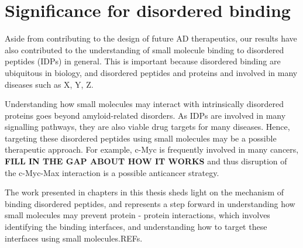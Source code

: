 
\section{Significance for disordered binding}
Aside from contributing to the design of future AD therapeutics, our results have also contributed to the understanding of small molecule binding to disordered peptides (IDPs) in general. This is important because disordered binding are ubiquitous in biology, and disordered peptides and proteins and involved in many diseases such as X, Y, Z.  

Understanding how small molecules may interact with intrinsically disordered proteins goes beyond amyloid-related disorders. As IDPs are involved in many signalling pathways, they are also viable drug targets for many diseases.   Hence, targeting these disordered peptides using small molecules may be a possible therapeutic approach. For example, c-Myc is frequently involved in many cancers, \textbf{FILL IN THE GAP ABOUT HOW IT WORKS} and thus disruption of the c-Myc-Max interaction is a possible anticancer strategy.\cite{Iakoucheva:2002uv,Metallo:2010p6822,Cuchillo:2012bm}

The work presented in chapters in this thesis sheds light on the mechanism of binding disordered peptides, and represents a step forward in understanding how small molecules may prevent protein - protein interactions, which involves identifying the binding interfaces, and understanding how to target these interfaces using small molecules.REFs.

